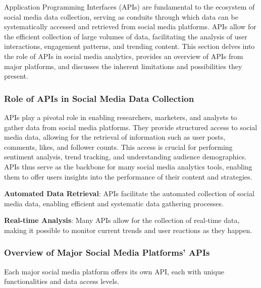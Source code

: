 \documentclass[
]{book}
\begin{document}
Application Programming Interfaces (APIs) are fundamental to the ecosystem of social media data collection, serving as conduits through which data can be systematically accessed and retrieved from social media platforms. APIs allow for the efficient collection of large volumes of data, facilitating the analysis of user interactions, engagement patterns, and trending content. This section delves into the role of APIs in social media analytics, provides an overview of APIs from major platforms, and discusses the inherent limitations and possibilities they present.

\hypertarget{role-of-apis-in-social-media-data-collection}{%
\subsubsection*{Role of APIs in Social Media Data Collection}\label{role-of-apis-in-social-media-data-collection}}

APIs play a pivotal role in enabling researchers, marketers, and analysts to gather data from social media platforms. They provide structured access to social media data, allowing for the retrieval of information such as user posts, comments, likes, and follower counts. This access is crucial for performing sentiment analysis, trend tracking, and understanding audience demographics. APIs thus serve as the backbone for many social media analytics tools, enabling them to offer users insights into the performance of their content and strategies.

\textbf{Automated Data Retrieval}: APIs facilitate the automated collection of social media data, enabling efficient and systematic data gathering processes.

\textbf{Real-time Analysis}: Many APIs allow for the collection of real-time data, making it possible to monitor current trends and user reactions as they happen.

\hypertarget{overview-of-major-social-media-platforms-apis}{%
\subsubsection*{Overview of Major Social Media Platforms' APIs}\label{overview-of-major-social-media-platforms-apis}}

Each major social media platform offers its own API, each with unique functionalities and data access levels.
\end{document}
